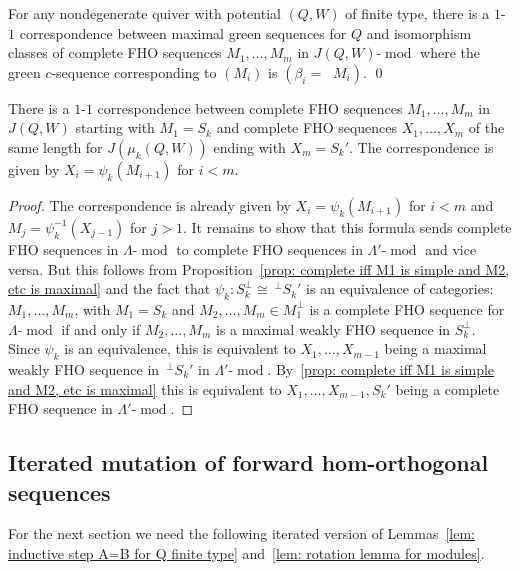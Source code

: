 \documentclass[ALCO,ThmDefs,Unicode,epreuves]{cedram}
\DeclareMathOperator{\undim}{\underline{dim}}
\DeclareMathOperator{\modr}{mod}
\begin{document}
\begin{coro}\label{cor: main thm of section 2}
For any nondegenerate quiver with potential $(Q,W)$ of finite type, there is a $1$-$1$ correspondence between maximal green sequences for $Q$ and isomorphism classes of complete FHO sequences $M_1,\ldots,M_m$ in $J(Q,W)\text{-}\modr $ where the green $c$-sequence corresponding to $(M_i)$ is $(\beta_i=\undim M_i)$. \qed
\end{coro}

\begin{coro}\label{cor: rotation lemma}
There is a $1$-$1$ correspondence between complete FHO sequences $M_1,\ldots,M_m$ in $J(Q,W)$ starting with $M_1=S_k$ and complete FHO sequences $X_1,\ldots,X_m$ of the same length for $J(\mu_k(Q,W))$ ending with $X_m=S_k'$. The correspondence is given by $X_i=\psi_k(M_{i+1})$ for $i<m$.
\end{coro}

\begin{proof} The correspondence is already given by $X_i=\psi_k(M_{i+1})$ for $i<m$ and $M_j=\psi_k^{-1}(X_{j-1})$ for $j>1$. It remains to show that this formula sends complete FHO sequences in $\Lambda\text{-}\modr $ to complete FHO sequences in $\Lambda'\text{-}\modr $ and vice versa. But this follows from Proposition~\ref{prop: complete iff M1 is simple and M2, etc is maximal} and the fact that $\psi_k:S_k^\perp\cong \,^\perp S_k'$ is an equivalence of categories: $M_1,\ldots,M_m$, with $M_1=S_k$ and $M_2,\ldots,M_m\in M_1^\perp$ is a complete FHO sequence for $\Lambda\text{-}\modr $ if and only if $M_2,\ldots,M_m$ is a maximal weakly FHO sequence in $S_k^\perp$. Since $\psi_k$ is an equivalence, this is equivalent to $X_1,\ldots,X_{m-1}$ being a maximal weakly FHO sequence in $\,^\perp S_k'$ in $\Lambda'\text{-}\modr $. By~\ref{prop: complete iff M1 is simple and M2, etc is maximal} this is equivalent to $X_1,\ldots,X_{m-1},S_k'$ being a complete FHO sequence in $\Lambda'\text{-}\modr $.
\end{proof}

\subsection{Iterated mutation of forward hom-orthogonal sequences}


For the next section we need the following iterated version of Lemmas~\ref{lem: inductive step A=B for Q finite type} and~\ref{lem: rotation lemma for modules}.
\end{document}

